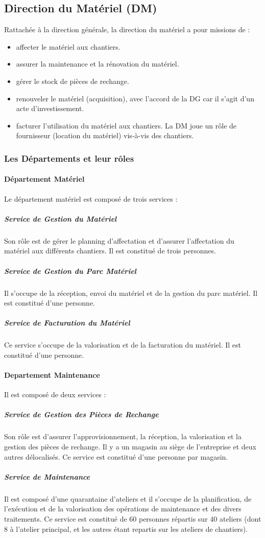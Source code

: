     \subsection{Direction du Matériel (DM)}
            Rattachée à la direction générale, la direction du matériel a pour missions de :
            \begin{itemize}
                \item affecter le matériel aux chantiers.
                \item assurer la maintenance et la rénovation du matériel.
                \item gérer le stock de pièces de rechange.
                \item renouveler le matériel (acquisition), avec l'accord de la DG car il s'agit d'un acte d'investissement.
                \item facturer l'utilisation du matériel aux chantiers. La DM joue un rôle de fournisseur (location du matériel) vis-à-vis des chantiers.
            \end{itemize}
            
        \subsubsection{Les Départements et leur rôles}
            \paragraph{Département Matériel}
                Le département matériel est composé de trois services :
                \subparagraph{Service de Gestion du Matériel}
                    Son rôle est de gérer le planning d'affectation et d'assurer l'affectation du matériel aux différents chantiers. Il est constitué de trois personnes.
                \subparagraph{Service de Gestion du Parc Matériel}
                    Il s'occupe de la réception, envoi du matériel et de la gestion du parc matériel. Il est constitué d'une personne.
                \subparagraph{Service de Facturation du Matériel}
                    Ce service s'occupe de la valorisation et de la facturation du matériel. Il est constitué d'une personne.        
                
            \paragraph{Departement Maintenance}
                Il est composé de deux services :
                \subparagraph{Service de Gestion des Pièces de Rechange}
                    Son rôle est d'assurer l'approvisionnement, la réception, la valorisation et la gestion des pièces   de rechange. Il y a un magasin au siège de l'entreprise et deux autres délocalisés. Ce service est constitué d'une personne par magasin. 
                \subparagraph{Service de Maintenance}
                    Il est composé d'une quarantaine d'ateliers et il s'occupe de la planification, de l'exécution et de la valorisation des opérations de maintenance et des divers traitements. Ce service est constitué de 60 personnes répartis sur 40 ateliers (dont 8 à l'atelier principal, et les autres étant repartis sur les ateliers de chantiers).

